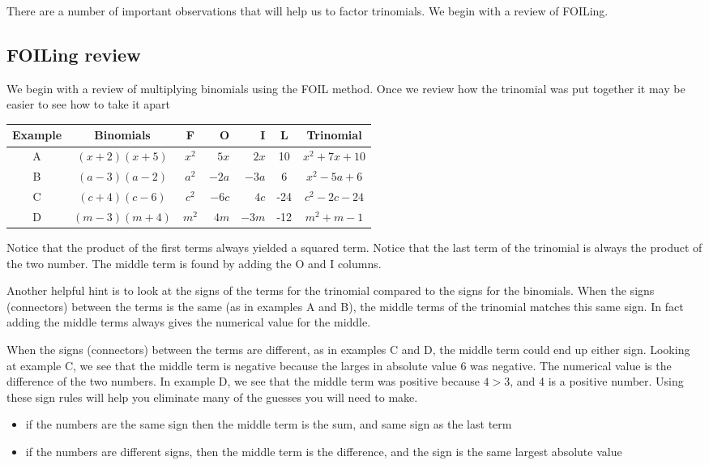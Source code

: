 There are a number of important observations that will help us to factor trinomials. We 
begin with a review of FOILing. 

\subsection{FOILing review}
We begin with a review of multiplying binomials using the FOIL method. Once we review
how the trinomial was put together it may be easier to see how to take it apart
\begin{center}
	\begin{tabular}{cccrrSc}
		\toprule
        Example & Binomials    & F     & O     & I     & {L}     & Trinomial   \\
		\midrule
		A       & $(x+2)(x+5)$ & $x^2$ & $5x$  & $2x$  & 10  & $x^2+7x+10$ \\
		B       & $(a-3)(a-2)$ & $a^2$ & $-2a$ & $-3a$ & 6   & $x^2-5a+6$  \\
		C       & $(c+4)(c-6)$ & $c^2$ & $-6c$ & $4c$  & -24 & $c^2-2c-24$ \\
		D       & $(m-3)(m+4)$ & $m^2$ & $4m$  & $-3m$ & -12 & $m^2+m-1$   \\
		\bottomrule
	\end{tabular}
\end{center}

Notice that the product of the first terms always yielded a squared term. Notice that the last
term of the trinomial is always the product of the two number. The middle term is found
by adding the O and I columns. 

Another helpful hint is to look at the signs of the terms for the trinomial compared to the signs
for the binomials. When the signs (connectors) between the terms is the same (as in examples A and B), 
the middle terms of the trinomial matches this same sign. In fact adding the middle terms always gives
the numerical value for the middle.

When the signs (connectors) between the terms are different, as in examples C and D, the middle
term could end up either sign. Looking at example C, we see that the middle term is negative
because the larges in absolute value $6$ was negative. The numerical value is the
difference of the two numbers. In example D, we see that the middle term was positive because
$4>3$, and 4 is a positive number. Using these sign rules will help you eliminate
many of the guesses you will need to make.

\begin{myDefinition} 
	\begin{itemize}
		\item if the numbers are the same sign then the middle term is the sum, and same sign as the last term
		\item if the numbers are different signs, then the middle term is the difference, and the sign is the same
		largest absolute value
	\end{itemize} 
\end{myDefinition}

